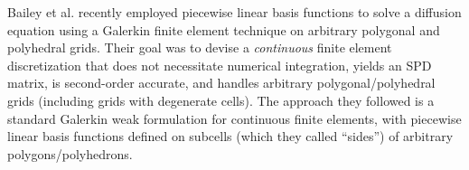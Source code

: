 \documentclass[preprint,10pt]{elsarticle}
\begin{document}
%
Bailey et al. \cite{BaileyAdams2008} recently employed piecewise linear basis
functions to solve a diffusion equation using a Galerkin finite element technique on 
arbitrary polygonal and polyhedral grids. Their goal was to devise a {\em continuous} finite 
element discretization that does not necessitate numerical integration, yields an SPD matrix, 
is second-order accurate, and handles arbitrary polygonal/polyhedral grids (including 
grids with degenerate cells). The approach they followed is a standard Galerkin weak 
formulation for continuous finite elements, with piecewise linear basis functions 
defined on subcells (which they called ``sides'') of arbitrary polygons/polyhedrons.
\end{document}
